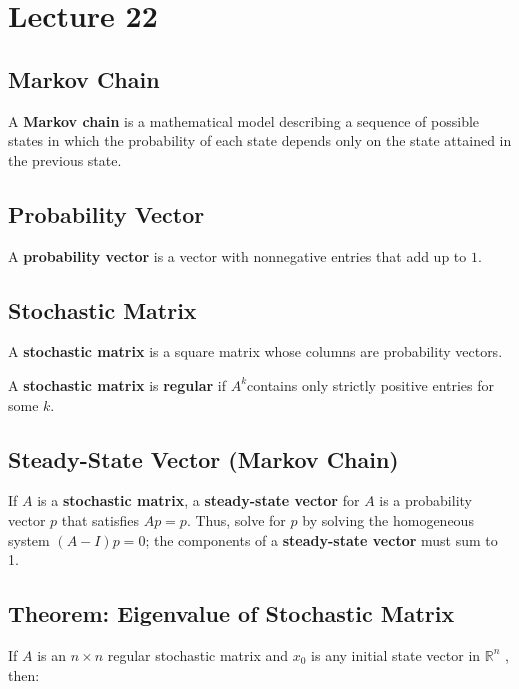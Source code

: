 \documentclass[12pt, letterpaper]{article}
\begin{document}
  \section*{Lecture 22}

  \subsection*{Markov Chain}

  A \textbf{Markov chain} is a mathematical model describing a
  sequence of possible states in which the probability of each state
  depends only on the state attained in the previous state.

  \subsection*{Probability Vector}

  A \textbf{probability vector} is a vector with nonnegative entries
  that add up to $ 1 $.

  \subsection*{Stochastic Matrix}

  A \textbf{stochastic matrix} is a square matrix whose columns are
  probability vectors.
  \bigskip

  A \textbf{stochastic matrix} is \textbf{regular} if $ A^k $contains
  only strictly positive entries for some $ k $.

  \subsection*{Steady-State Vector (Markov Chain)}

  If $ A $ is a \textbf{stochastic matrix}, a \textbf{steady-state
  vector} for $ A $ is a probability vector $ p $ that satisfies $ Ap
  = p $. Thus, solve for $ p $ by solving the homogeneous system $ (A
  - I)p = 0 $; the components of a \textbf{steady-state vector} must sum to 1.
  \bigskip

  \subsection*{Theorem: Eigenvalue of Stochastic Matrix}

  If $ A $ is an $ n \times n $ regular stochastic matrix and $ x_0 $
  is any initial state vector in $ \mathbb{R}^n $ , then:
\end{document}

